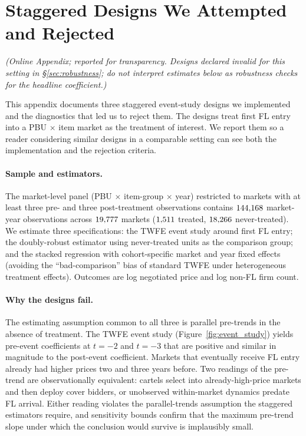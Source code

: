 

\section{Staggered Designs We Attempted and Rejected}
\label{app:did}
\noindent\textit{(Online Appendix; reported for transparency.
Designs declared invalid for this setting in
\S\ref{sec:robustness}; do not interpret estimates below as
robustness checks for the headline coefficient.)}\medskip

This appendix documents three staggered event-study designs we
implemented and the diagnostics that led us to reject them. The
designs treat first FL entry into a PBU $\times$ item market as
the treatment of interest. We report them so a reader
considering similar designs in a comparable setting can see
both the implementation and the rejection criteria.

\paragraph{Sample and estimators.}
The market-level panel (PBU $\times$ item-group $\times$ year)
restricted to markets with at least three pre- and three
post-treatment observations contains $144{,}168$ market-year
observations across $19{,}777$ markets ($1{,}511$ treated,
$18{,}266$ never-treated). We estimate three specifications:
the TWFE event study around first FL entry; the
\citet{callaway2021difference} doubly-robust estimator using
never-treated units as the comparison group; and the
\citet{cengiz2019effect} stacked regression with cohort-specific
market and year fixed effects (avoiding the
``bad-comparison'' bias of standard TWFE under heterogeneous
treatment effects). Outcomes are log negotiated price and
log non-FL firm count.

\paragraph{Why the designs fail.}
The estimating assumption common to all three is parallel
pre-trends in the absence of treatment. The TWFE event study
(Figure~\ref{fig:event_study}) yields pre-event coefficients
at $t = -2$ and $t = -3$ that are positive and similar in
magnitude to the post-event coefficient. Markets that
eventually receive FL entry already had higher prices two and
three years before. Two readings of the pre-trend are
observationally equivalent: cartels select into already-high-price
markets and then deploy cover bidders, or unobserved
within-market dynamics predate FL arrival. Either reading
violates the parallel-trends assumption the staggered
estimators require, and \citet{rambachan2023more} sensitivity
bounds confirm that the maximum pre-trend slope under which
the conclusion would survive is implausibly small.


